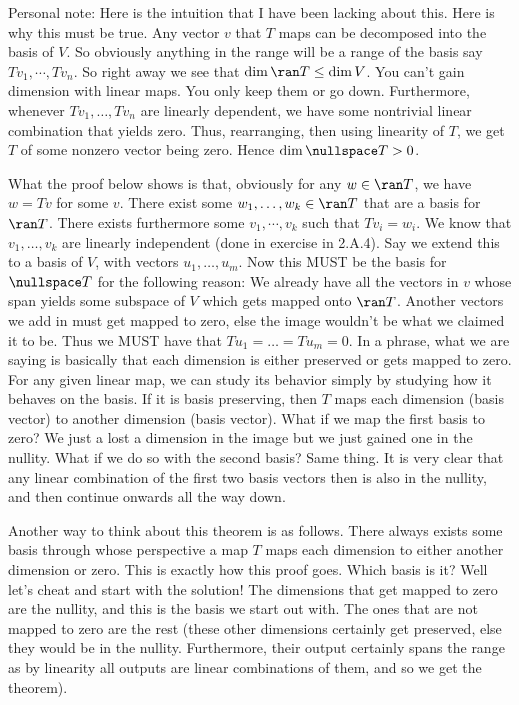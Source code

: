 \documentclass{article}
\begin{document}
  \begin{remark}
    Personal note: Here is the intuition that I have been lacking about this. Here is why this must be true. Any vector $v$ that $T$ maps can be decomposed into the basis of $V$. So
    obviously anything in the range will be a range of the basis say $Tv_1, \cdots, Tv_n$. So right away we see that $\dim\ran T \leq \dim V$. You can't gain dimension with linear maps. You
    only keep them or go down. Furthermore, whenever $Tv_1, \dots, Tv_n$ are linearly dependent, we have some nontrivial linear combination that yields zero. Thus, rearranging, then using
    linearity of $T$, we get $T$ of some nonzero vector being zero. Hence $\dim\nullspace T > 0$.

    What the proof below shows is that, obviously for any $w \in \ran T$, we have $w = Tv$ for some $v$. There exist some $w_1, \dots, w_k \in \ran T$ that are a basis for $\ran T$. There
    exists furthermore some $v_1, \cdots, v_k$ such that $Tv_i = w_i$. We know that $v_1, \dots, v_k$ are linearly independent (done in exercise in 2.A.4). Say we extend this to a basis of
    $V$, with vectors $u_1, \dots, u_m$. Now this MUST be the basis for $\nullspace T$ for the following reason: We already have all the vectors in $v$ whose span yields some subspace of $V$
    which gets mapped onto $\ran T$. Another vectors we add in must get mapped to zero, else the image wouldn't be what we claimed it to be. Thus we MUST have that $Tu_1 = \dots = Tu_m = 0$.
    In a phrase, what we are saying is basically that each dimension is either preserved or gets mapped to zero. For any given linear map, we can study its behavior simply by studying how it
    behaves on the basis. If it is basis preserving, then $T$ maps each dimension (basis vector) to another dimension (basis vector). What if we map the first basis to zero? We just a lost a
    dimension in the image but we just gained one in the nullity. What if we do so with the second basis? Same thing. It is very clear that any linear combination of the first two basis
    vectors then is also in the nullity, and then continue onwards all the way down.

    Another way to think about this theorem is as follows. There always exists some basis through whose perspective a map $T$ maps each dimension to either another dimension or zero. This is
    exactly how this proof goes. Which basis is it? Well let's cheat and start with the solution! The dimensions that get mapped to zero are the nullity, and this is the basis we start out
    with. The ones that are not mapped to zero are the rest (these other dimensions certainly get preserved, else they would be in the nullity. Furthermore, their output certainly spans the
    range as by linearity all outputs are linear combinations of them, and so we get the theorem).
  \end{remark}
\end{document}
